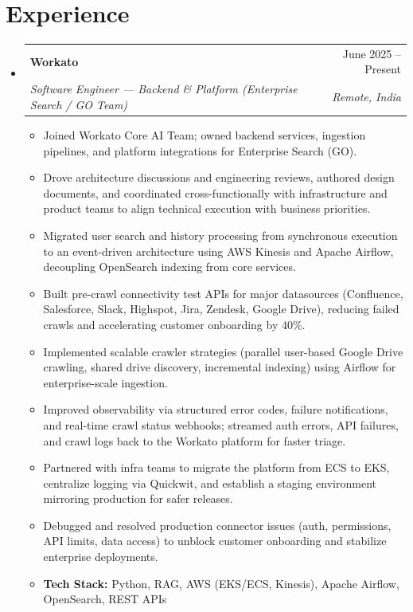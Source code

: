 \documentclass[letterpaper,10pt]{article}
\makeatletter
\newcommand{\resumeItem}[1]{
  \item \small{#1}
}
\newcommand{\resumeSubheading}[4]{
  \vspace{1pt}\item
    \begin{tabular*}{1.0\textwidth}[t]{l@{\extracolsep{\fill}}r}
      \textbf{#1} & #2 \\
      \textit{#3} & \textit{#4} \\
    \end{tabular*}\vspace{-2pt}
}
\newcommand{\resumeSubHeadingListStart}{\begin{itemize}[leftmargin=0.0in, label={}, topsep=2pt, itemsep=2pt]}
\newcommand{\resumeSubHeadingListEnd}{\end{itemize}}
\newcommand{\resumeItemListStart}{\begin{itemize}[topsep=2pt, itemsep=2pt]}
\newcommand{\resumeItemListEnd}{\end{itemize}\vspace{1pt}}
\makeatother
\begin{document}
\section{Experience}

\resumeSubHeadingListStart
\resumeSubheading
{Workato}{June 2025 -- Present}
{Software Engineer — Backend \& Platform (Enterprise Search / GO Team)}{Remote, India}
\resumeItemListStart
\resumeItem{Joined Workato Core AI Team; owned backend services, ingestion pipelines, and platform integrations for Enterprise Search (GO).}
\resumeItem{Drove architecture discussions and engineering reviews, authored design documents, and coordinated cross-functionally with infrastructure and product teams to align technical execution with business priorities.}
\resumeItem{Migrated user search and history processing from synchronous execution to an event-driven architecture using AWS Kinesis and Apache Airflow, decoupling OpenSearch indexing from core services.}
\resumeItem{Built pre-crawl connectivity test APIs for major datasources (Confluence, Salesforce, Slack, Highspot, Jira, Zendesk, Google Drive), reducing failed crawls and accelerating customer onboarding by 40\%.}
\resumeItem{Implemented scalable crawler strategies (parallel user-based Google Drive crawling, shared drive discovery, incremental indexing) using Airflow for enterprise-scale ingestion.}
\resumeItem{Improved observability via structured error codes, failure notifications, and real-time crawl status webhooks; streamed auth errors, API failures, and crawl logs back to the Workato platform for faster triage.}
\resumeItem{Partnered with infra teams to migrate the platform from ECS to EKS, centralize logging via Quickwit, and establish a staging environment mirroring production for safer releases.}
\resumeItem{Debugged and resolved production connector issues (auth, permissions, API limits, data access) to unblock customer onboarding and stabilize enterprise deployments.}
\resumeItem{\textbf{Tech Stack:} Python, RAG, AWS (EKS/ECS, Kinesis), Apache Airflow, OpenSearch, REST APIs}
\resumeItemListEnd
\resumeSubHeadingListEnd
\end{document}
